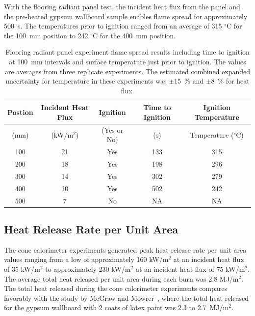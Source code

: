 \documentclass[twoside]{uocthesis}
\begin{document}
{ With the flooring radiant panel test, the incident heat flux from the panel and the pre-heated gypsum wallboard sample enables flame spread for approximately 500~s.  The temperatures prior to ignition ranged from an average of 315 $^{\circ}$C for the 100~mm position to 242 $^{\circ}$C for the 400~mm position.      
 
      
\begin{table}
	\centering
	\small
	\begin{tabular}{|c|c|c|c|c|}
		\hline Postion & Incident Heat Flux & Ignition & Time to Ignition & Ignition Temperature \\
		\hline (mm) & (kW/m$^2$) & (Yes or No) & (s)  & Temperature ($^{\circ}$C)   \\ \hline
		\hline 100 	& 21	& Yes 	& 133	& 315 	 \\
		\hline 200	& 18 	& Yes 	& 198 	& 296 	 \\
		\hline 300	& 14	& Yes 	& 302 	& 279 	 \\
		\hline 400	& 10	& Yes 	& 502 	& 242 	 \\
		\hline 500	&  7	& No 	& NA 	& NA   	 \\
		\hline
	\end{tabular}
	\caption[Flooring radiant panel experiment flame spread results]{Flooring radiant panel experiment flame spread results including time to ignition at 100~mm intervals and surface temperature just prior to ignition.  The values are averages from three replicate experiments.  The estimated combined expanded uncertainty for temperature in these experiments was $\pm$15~\% and $\pm$8~\% for heat flux.}
	\label{tab:FRP_timetemp}
\end{table}


\subsection{Heat Release Rate per Unit Area}

The cone calorimeter experiments generated peak heat release rate per unit area values ranging from a low of approximately 160 kW/m$^2$ at an incident heat flux of 35 kW/m$^2$ to approximately 230 kW/m$^2$ at an incident heat flux of 75 kW/m$^2$.  The average total heat released per unit area during each burn was 2.8 MJ/m$^2$.  The total heat released during the cone calorimeter experiments compares favorably with the study by McGraw and Mowrer~\cite{McGraw:1999}, where the total heat released for the gypsum wallboard with 2 coats of latex paint was 2.3 to 2.7~MJ/m$^2$.      

}
\end{document}
